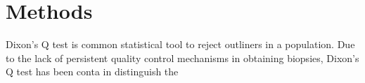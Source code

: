 \chapter{Methods}

Dixon's Q test is common statistical tool to reject outliners in a population. Due to the lack of persistent quality control mechanisms in obtaining biopsies, Dixon's Q test has been conta in distinguish the 